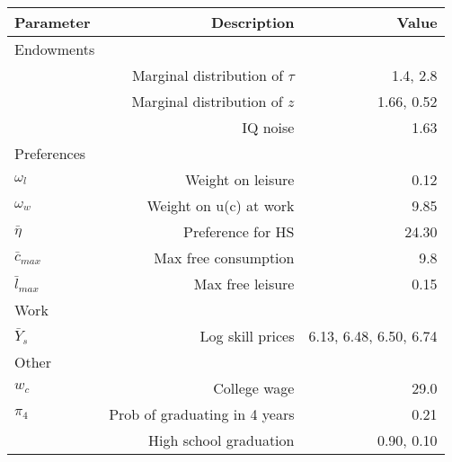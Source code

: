 \begin{tabular}{lrr}
\hline
Parameter & Description  & Value  \\ 
\hline
Endowments &   &   \\ 
 & Marginal distribution of $\tau$  & 1.4, 2.8  \\ 
 & Marginal distribution of $z$  & 1.66, 0.52  \\ 
 & IQ noise  & 1.63  \\ 
Preferences &   &   \\ 
$\omega_{l}$ & Weight on leisure  & 0.12  \\ 
$\omega_{w}$ & Weight on u(c) at work  & 9.85  \\ 
$\bar{\eta}$ & Preference for HS  & 24.30  \\ 
$\bar{c}_{max}$ & Max free consumption  & 9.8  \\ 
$\bar{l}_{max}$ & Max free leisure  & 0.15  \\ 
Work &   &   \\ 
$\bar{Y}_{s}$ & Log skill prices  & 6.13, 6.48, 6.50, 6.74  \\ 
Other &   &   \\ 
$w_{c}$ & College wage  & 29.0  \\ 
$\pi_{4}$ & Prob of graduating in 4 years  & 0.21  \\ 
 & High school graduation  & 0.90, 0.10  \\ 
\hline
\end{tabular}%

